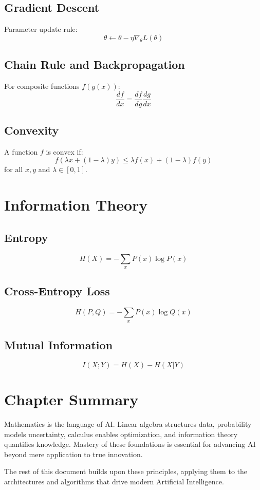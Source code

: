 \documentclass[openany]{book}
\begin{document}
\subsection{Gradient Descent}
Parameter update rule:
\[
\theta \leftarrow \theta - \eta \nabla_\theta L(\theta)
\]

\subsection{Chain Rule and Backpropagation}
For composite functions $f(g(x))$:
\[
\frac{df}{dx} = \frac{df}{dg}\frac{dg}{dx}
\]

\subsection{Convexity}
A function $f$ is convex if:
\[
f(\lambda x + (1-\lambda)y) \leq \lambda f(x) + (1-\lambda)f(y)
\]
for all $x,y$ and $\lambda \in [0,1]$.

\section{Information Theory}

\subsection{Entropy}
\[
H(X) = -\sum_x P(x)\log P(x)
\]

\subsection{Cross-Entropy Loss}
\[
H(P,Q) = -\sum_x P(x)\log Q(x)
\]

\subsection{Mutual Information}
\[
I(X;Y) = H(X) - H(X|Y)
\]

\section{Chapter Summary}

Mathematics is the language of AI. Linear algebra structures data, probability 
models uncertainty, calculus enables optimization, and information theory 
quantifies knowledge. Mastery of these foundations is essential for advancing 
AI beyond mere application to true innovation.

The rest of this document builds upon these principles, applying them to the 
architectures and algorithms that drive modern Artificial Intelligence.
\end{document}

